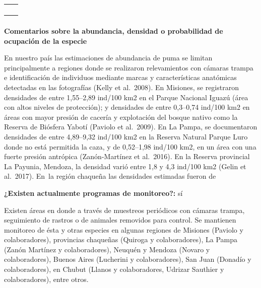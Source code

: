 \documentclass[
  x11names]{article}
\begin{document}
\begin{tabu} to 
\toprule
\textbf{} & \\
\bottomrule
\end{tabu}

\begin{tabu} to 
\toprule
\textbf{} & \\
\bottomrule
\end{tabu}

\textbf{Comentarios sobre la abundancia, densidad o probabilidad de
ocupación de la especie}

En nuestro país las estimaciones de abundancia de puma se limitan
principalmente a regiones donde se realizaron relevamientos con cámaras
trampa e identificación de individuos mediante marcas y características
anatómicas detectadas en las fotografías (Kelly et al.~2008). En
Misiones, se registraron densidades de entre 1,55--2,89 ind/100 km2 en
el Parque Nacional Iguazú (área con altos niveles de protección); y
densidades de entre 0,3--0,74 ind/100 km2 en áreas con mayor presión de
cacería y explotación del bosque nativo como la Reserva de Biósfera
Yabotí (Paviolo et al.~2009). En La Pampa, se documentaron densidades de
entre 4,89--9,32 ind/100 km2 en la Reserva Natural Parque Luro donde no
está permitida la caza, y de 0,52--1,98 ind/100 km2, en un área con una
fuerte presión antrópica (Zanón-Martínez et al.~2016). En la Reserva
provincial La Payunia, Mendoza, la densidad varió entre 1,8 y 4,3
ind/100 km2 (Gelin et al.~2017). En~la región chaqueña las densidades
estimadas fueron de

\textbf{¿Existen actualmente programas de monitoreo?:} sí

Existen áreas en donde a través de muestreos periódicos con cámaras
trampa, seguimiento de rastros o de animales removidos para control. Se
mantienen monitoreo de ésta y otras especies en algunas regiones de
Misiones (Paviolo y colaboradores), provincias chaqueñas (Quiroga y
colaboradores), La Pampa (Zanón Martínez y colaboradores), Neuquén y
Mendoza (Novaro y colaboradores), Buenos Aires (Lucherini y
colaboradores), San Juan (Donadío y colaboradores), en Chubut (Llanos y
colaboradores, Udrizar Sauthier y colaboradores), entre otros.

\end{document}
